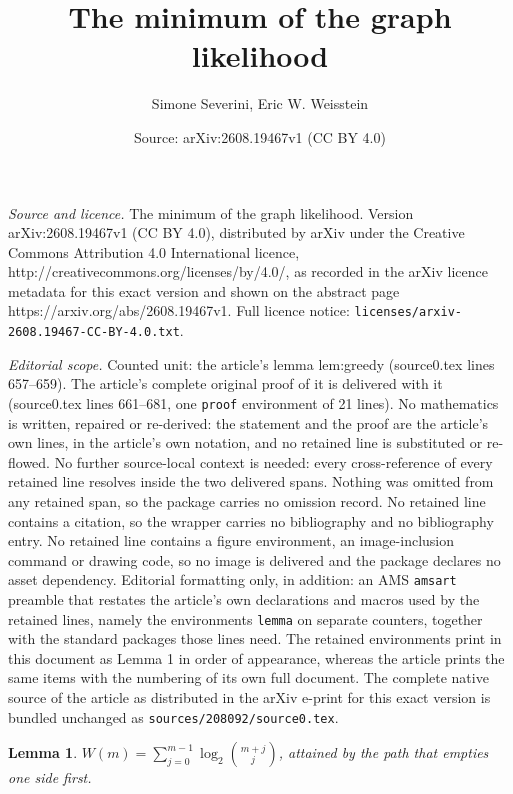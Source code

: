 \documentclass[10pt,a4paper]{amsart}
\title{The minimum of the graph likelihood}
\author{Simone Severini, Eric W. Weisstein}
\date{Source: arXiv:2608.19467v1 (CC BY 4.0)}
\newtheorem{lemma}{Lemma}
\newcommand{\bin}[2]{\binom{#1}{#2}}
\begin{document}
\maketitle

\noindent\emph{Source and licence.} The minimum of the graph likelihood. Version arXiv:2608.19467v1 (CC BY 4.0), distributed by arXiv under the Creative Commons Attribution 4.0 International licence, http://creativecommons.org/licenses/by/4.0/, as recorded in the arXiv licence metadata for this exact version and shown on the abstract page https://arxiv.org/abs/2608.19467v1. Full licence notice: \texttt{licenses/arxiv-2608.19467-CC-BY-4.0.txt}.\par\smallskip

\noindent\textit{Editorial scope.} Counted unit: the article's lemma lem:greedy (source0.tex lines 657--659). The article's complete original proof of it is delivered with it (source0.tex lines 661--681, one \texttt{proof} environment of 21 lines). No mathematics is written, repaired or re-derived: the statement and the proof are the article's own lines, in the article's own notation, and no retained line is substituted or re-flowed.  No further source-local context is needed: every cross-reference of every retained line resolves inside the two delivered spans.  Nothing was omitted from any retained span, so the package carries no omission record.  No retained line contains a citation, so the wrapper carries no bibliography and no bibliography entry.  No retained line contains a figure environment, an image-inclusion command or drawing code, so no image is delivered and the package declares no asset dependency.  Editorial formatting only, in addition: an AMS \texttt{amsart} preamble that restates the article's own declarations and macros used by the retained lines, namely the environments \texttt{lemma} on separate counters, together with the standard packages those lines need.  The retained environments print in this document as Lemma 1 in order of appearance, whereas the article prints the same items with the numbering of its own full document.  The complete native source of the article as distributed in the arXiv e-print for this exact version is bundled unchanged as \texttt{sources/208092/source0.tex}.
\begin{lemma}\label{lem:greedy}
$W(m)=\sum_{j=0}^{m-1}\log_2\bin{m+j}{j}$, attained by the path that empties one side first.
\end{lemma}
\end{document}
